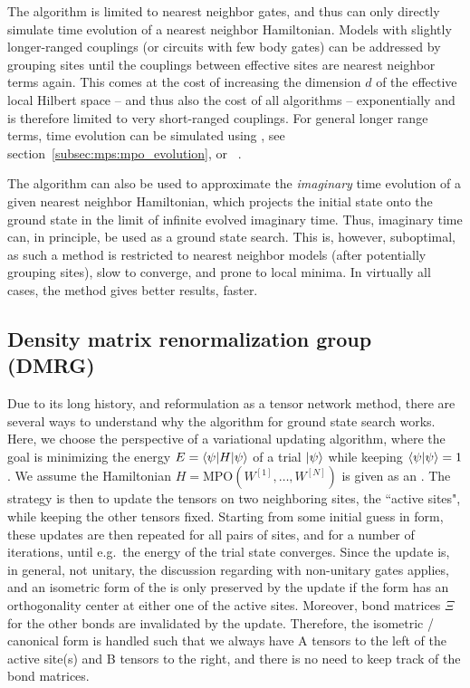 The  algorithm is limited to nearest neighbor gates, and thus can only directly simulate time evolution of a nearest neighbor Hamiltonian.
%
Models with slightly longer-ranged couplings (or circuits with few body gates) can be addressed by grouping sites until the couplings between effective sites are nearest neighbor terms again.
%
This comes at the cost of increasing the dimension $d$ of the effective local Hilbert space -- and thus also the cost of all algorithms -- exponentially and is therefore limited to very short-ranged couplings.
%
For general longer range terms, time evolution can be simulated using , see section~\ref{subsec:mps:mpo_evolution}, or ~\cite{haegeman2011a, haegeman2016a}.

The  algorithm can also be used to approximate the \emph{imaginary} time evolution of a given nearest neighbor Hamiltonian, which projects the initial state onto the ground state in the limit of infinite evolved imaginary time.
%
Thus, imaginary time  can, in principle, be used as a ground state search.
%
This is, however, suboptimal, as such a method is restricted to nearest neighbor models (after potentially grouping sites), slow to converge, and prone to local minima.
%
In virtually all cases, the  method gives better results, faster.

\subsection{Density matrix renormalization group (DMRG)}
\label{subsec:mps:dmrg}

Due to its long history, and reformulation as a tensor network method, there are several ways to understand why the  algorithm for  ground state search works.
%
Here, we choose the perspective of a variational updating algorithm, where the goal is minimizing the energy $E = \braopket{\psi}{H}{\psi}$ of a trial  $\ket{\psi}$ while keeping $\braket{\psi}{\psi} = 1$.
%
We assume the Hamiltonian $H = \text{MPO}(W^{[1]},\dots,W^{[N]})$ is given as an .
%
The strategy is then to update the  tensors on two neighboring sites, the ``active sites", while keeping the other tensors fixed.
%
Starting from some initial guess in  form, these updates are then repeated for all pairs of sites, and for a number of iterations, until e.g.~the energy of the trial state converges.
%
Since the update is, in general, not unitary, the discussion regarding  with non-unitary gates applies, and an isometric form of the  is only preserved by the update if the form has an orthogonality center at either one of the active sites.
%
Moreover, bond matrices $\Xi$ for the other bonds are invalidated by the update.
%
Therefore, the isometric / canonical form is handled such that we always have A tensors to the left of the active site(s) and B tensors to the right, and there is no need to keep track of the bond matrices.

